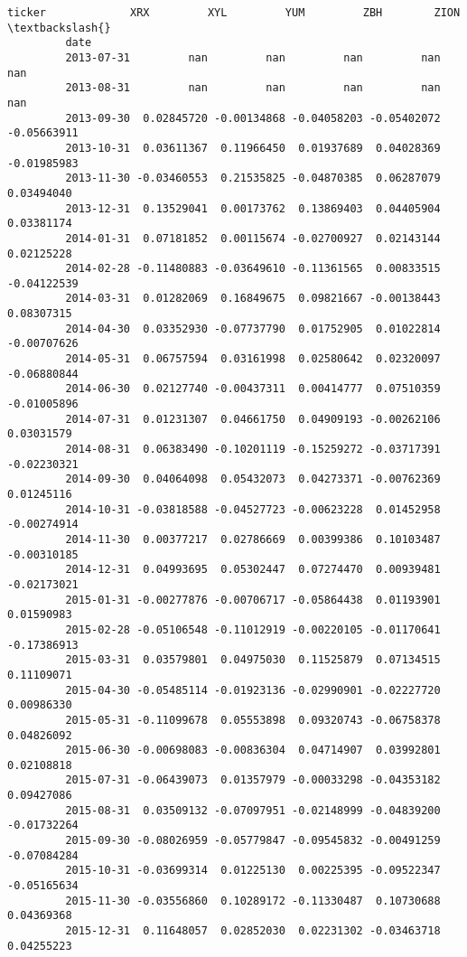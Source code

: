 \documentclass[11pt]{article}
\begin{document}
\begin{Verbatim}[commandchars=\\\{\}]
         ticker             XRX         XYL         YUM         ZBH        ZION  \textbackslash{}
         date                                                                     
         2013-07-31         nan         nan         nan         nan         nan   
         2013-08-31         nan         nan         nan         nan         nan   
         2013-09-30  0.02845720 -0.00134868 -0.04058203 -0.05402072 -0.05663911   
         2013-10-31  0.03611367  0.11966450  0.01937689  0.04028369 -0.01985983   
         2013-11-30 -0.03460553  0.21535825 -0.04870385  0.06287079  0.03494040   
         2013-12-31  0.13529041  0.00173762  0.13869403  0.04405904  0.03381174   
         2014-01-31  0.07181852  0.00115674 -0.02700927  0.02143144  0.02125228   
         2014-02-28 -0.11480883 -0.03649610 -0.11361565  0.00833515 -0.04122539   
         2014-03-31  0.01282069  0.16849675  0.09821667 -0.00138443  0.08307315   
         2014-04-30  0.03352930 -0.07737790  0.01752905  0.01022814 -0.00707626   
         2014-05-31  0.06757594  0.03161998  0.02580642  0.02320097 -0.06880844   
         2014-06-30  0.02127740 -0.00437311  0.00414777  0.07510359 -0.01005896   
         2014-07-31  0.01231307  0.04661750  0.04909193 -0.00262106  0.03031579   
         2014-08-31  0.06383490 -0.10201119 -0.15259272 -0.03717391 -0.02230321   
         2014-09-30  0.04064098  0.05432073  0.04273371 -0.00762369  0.01245116   
         2014-10-31 -0.03818588 -0.04527723 -0.00623228  0.01452958 -0.00274914   
         2014-11-30  0.00377217  0.02786669  0.00399386  0.10103487 -0.00310185   
         2014-12-31  0.04993695  0.05302447  0.07274470  0.00939481 -0.02173021   
         2015-01-31 -0.00277876 -0.00706717 -0.05864438  0.01193901  0.01590983   
         2015-02-28 -0.05106548 -0.11012919 -0.00220105 -0.01170641 -0.17386913   
         2015-03-31  0.03579801  0.04975030  0.11525879  0.07134515  0.11109071   
         2015-04-30 -0.05485114 -0.01923136 -0.02990901 -0.02227720  0.00986330   
         2015-05-31 -0.11099678  0.05553898  0.09320743 -0.06758378  0.04826092   
         2015-06-30 -0.00698083 -0.00836304  0.04714907  0.03992801  0.02108818   
         2015-07-31 -0.06439073  0.01357979 -0.00033298 -0.04353182  0.09427086   
         2015-08-31  0.03509132 -0.07097951 -0.02148999 -0.04839200 -0.01732264   
         2015-09-30 -0.08026959 -0.05779847 -0.09545832 -0.00491259 -0.07084284   
         2015-10-31 -0.03699314  0.01225130  0.00225395 -0.09522347 -0.05165634   
         2015-11-30 -0.03556860  0.10289172 -0.11330487  0.10730688  0.04369368   
         2015-12-31  0.11648057  0.02852030  0.02231302 -0.03463718  0.04255223   

\end{Verbatim}
\end{document}
